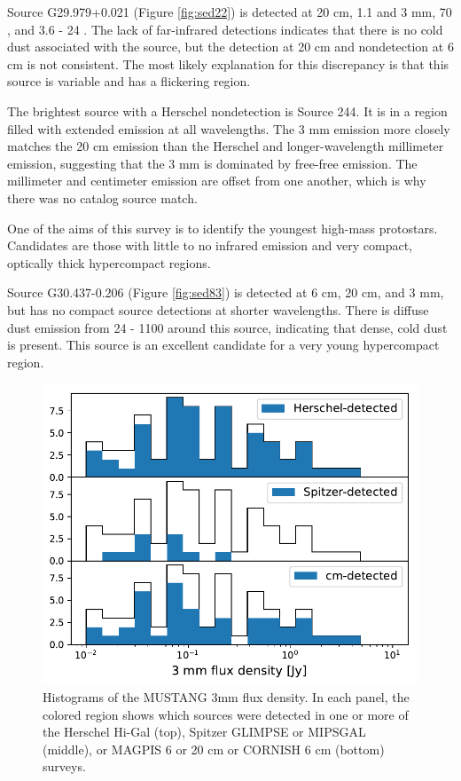 \documentclass[twocolumn]{aastex62}
\begin{document}
Source G29.979+0.021 (Figure \ref{fig:sed22}) is detected at 20 cm, 1.1 and 3 mm, 70 \um,
and 3.6 - 24 \um.  The lack of far-infrared detections indicates that there is
no cold dust associated with the source, but the detection at 20 cm and
nondetection at 6 cm is not consistent.  The most likely explanation for this
discrepancy is that this source is variable and has a flickering \hii region.

The brightest source with a Herschel nondetection is Source 244.  It is in a
region filled with extended emission at all wavelengths.  The 3 mm emission
more closely matches the 20 cm emission than the Herschel and longer-wavelength
millimeter emission, suggesting that the 3 mm is dominated by free-free
emission.  The millimeter and centimeter emission are offset from one another,
which is why there was no catalog source match.

One of the aims of this survey is to identify the youngest high-mass protostars.
Candidates are those with little to no infrared emission and very compact, optically
thick hypercompact \hii regions.

Source G30.437-0.206 (Figure \ref{fig:sed83}) is detected at 6 cm, 20 cm, and 3 mm, but has no compact source detections
at shorter wavelengths.  There is diffuse dust emission from 24 - 1100 \um around this
source, indicating that dense, cold dust is present.  This source is an excellent
candidate for a very young hypercompact \hii region.


\begin{figure}[htp]
    \includegraphics[scale=1]{figures/G31_dend_contour_thr4_minn20_mind1_detection_histograms.pdf}
\caption{Histograms of the MUSTANG 3mm flux density.  In each panel, the colored region shows which
sources were detected in one or more of the Herschel Hi-Gal (top), Spitzer GLIMPSE or MIPSGAL (middle),
or MAGPIS 6 or 20 cm or CORNISH 6 cm (bottom) surveys.}
\label{fig:histogram}
\end{figure}
\end{document}
